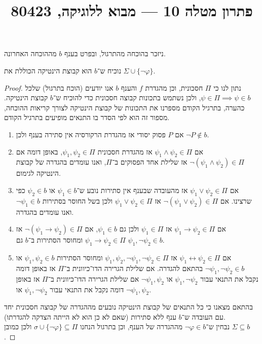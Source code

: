 
\title{פתרון מטלה 10 --- מבוא ללוגיקה, 80423}


\maketitle
\maketitleprint{}

\question{}
ניזכר בהוכחה מהתרגול, ובפרט בענף $b$ מההוכחה האחרונה.

\subquestion{}
נוכיח ש־$b$ הוא קבוצת הינטיקה הכוללת את $\Sigma \cup \{ \lnot \varphi \}$.
\begin{proof}
	נתון לנו כי $\Pi$ חסכונית, וכן מהגדרת $f$ והענף $b$ אנו יודעים (הוכח בתרגול) שלכל $\psi \in \Pi \implies \psi \in b$, ולכן נשתמש בתכונות קבוצה חסכונית כדי להוכיח ש־$b$ קבוצת הינטיקה.
	כהערה, בתרגיל הקודם מספרנו את התכונות של קבוצת הינטיקה לצורך קריאות ההוכחה, מספור זה הוא לפי הסדר בו התנאים מופיעים בתרגיל הקודם.
	\begin{enumerate}
		\item אם $P$ פסוק יסודי אז מהגדרת הרקורסיה אין סתירה בענף ולכן $\lnot P \notin b$.
		\item אם $\psi_1 \land \psi_2 \in \Pi$ אז מהגדרת חסכונית $\psi_1, \psi_2 \in \Pi$, באופן דומה אם $\lnot (\psi_1 \land \psi_2) \in \Pi$ אז שלילת אחד הפסוקים ב־$\Pi$, ואנו עומדים בהגדרה של קבוצת הינטיקה לגימום.
		\item אם $\psi_1 \lor \psi_2 \in \Pi$ אז מהעובדה שבענף אין סתירות נובע ש־$\psi_1 \in b$ או $\psi_2 \in b$ כפי שרצינו.
			אם $\lnot (\psi_1 \lor \psi_2) \in \Pi$ אז $\psi_1 \lor \psi_2 \in \Pi$ ולכן בשל החוסר בסתירות $\lnot \psi_1 \in b$ ואנו עומדים בהגדרה.
		\item אם $\psi_1 \to \psi_2 \in \Pi$ אז $\psi_1 \in \Pi$ ולכן גם $\psi_1 \in b$, אם $\lnot (\psi_1 \to \psi_2) \in \Pi$ אז $\psi_1 \to \psi_2 \in \Pi$ ומחוסר הסתירות ב־$b$ גם $\psi_1, \lnot \psi_2 \in b$.
		\item אם $\psi_1 \leftrightarrow \psi_2 \in \Pi$ אז $\psi_1, \psi_2, \lnot \psi_1, \lnot \psi_2 \in \Pi$ ומחוסר הסתירות $\psi_1, \psi_2 \in b$ או $\lnot \psi_1, \lnot \psi_2 \in b$ בהתאם להגדרה.
			אם שלילת הגרירה הדו־כיוונית ב־$\Pi$ אז באופן דומה נקבל את התנאי עבור $\psi_1, \lnot \psi_2$ או $\lnot \psi_1, \psi_2$
			אם שלילת הגרירה הדו־כיוונית ב־$\Pi$ אז באופן דומה נקבל את התנאי עבור $\psi_1, \lnot \psi_2$ או $\lnot \psi_1, \psi_2$.
	\end{enumerate}
	בהתאם מצאנו כי כל התנאים של קבוצת הינטיקה נובעים מההגדרה של קבוצה חסכונית יחד עם העובדה ש־$b$ ענף ללא סתירות (שאם לא כן הוא לא הייתה הצדקה להגדרתו). \\
	נבחין ש־$\lnot \varphi \in b$ מההגדרה של הענף, וכן בתרגול הנחנו $\sigma \cup \{ \lnot \varphi \} \subseteq \Pi$ ולכן כמובן $\Sigma \subseteq b$.
\end{proof}

